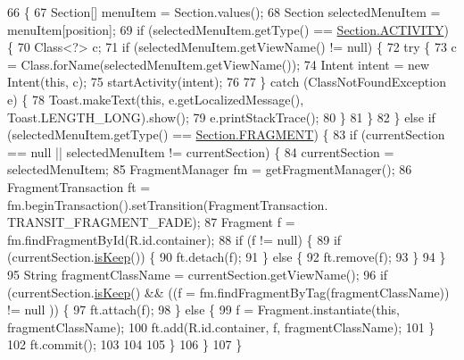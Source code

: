 \begin{DoxyCode}
66                                                              \{
67         Section[] menuItem = Section.values();
68         Section selectedMenuItem = menuItem[position];
69         \textcolor{keywordflow}{if} (selectedMenuItem.getType() == \hyperlink{enumorg_1_1buildmlearn_1_1toolkit_1_1model_1_1Section_a9afae152c2f7c91883417b9de909da27}{Section.ACTIVITY}) \{
70             Class<?> c;
71             \textcolor{keywordflow}{if} (selectedMenuItem.getViewName() != null) \{
72                 \textcolor{keywordflow}{try} \{
73                     c = Class.forName(selectedMenuItem.getViewName());
74                     Intent intent = \textcolor{keyword}{new} Intent(\textcolor{keyword}{this}, c);
75                     startActivity(intent);
76 
77                 \} \textcolor{keywordflow}{catch} (ClassNotFoundException e) \{
78                     Toast.makeText(\textcolor{keyword}{this}, e.getLocalizedMessage(), Toast.LENGTH\_LONG).show();
79                     e.printStackTrace();
80                 \}
81             \}
82         \} \textcolor{keywordflow}{else} \textcolor{keywordflow}{if} (selectedMenuItem.getType() == \hyperlink{enumorg_1_1buildmlearn_1_1toolkit_1_1model_1_1Section_a536f7f08eb441bb4af16270238999cc4}{Section.FRAGMENT}) \{
83             \textcolor{keywordflow}{if} (currentSection == null || selectedMenuItem != currentSection) \{
84                 currentSection = selectedMenuItem;
85                 FragmentManager fm = getFragmentManager();
86                 FragmentTransaction ft = fm.beginTransaction().setTransition(FragmentTransaction.
      TRANSIT\_FRAGMENT\_FADE);
87                 Fragment f = fm.findFragmentById(R.id.container);
88                 \textcolor{keywordflow}{if} (f != null) \{
89                     \textcolor{keywordflow}{if} (currentSection.\hyperlink{enumorg_1_1buildmlearn_1_1toolkit_1_1model_1_1Section_ae9b75c2d499a28b4aa0ee59fa73810f2}{isKeep}()) \{
90                         ft.detach(f);
91                     \} \textcolor{keywordflow}{else} \{
92                         ft.remove(f);
93                     \}
94                 \}
95                 String fragmentClassName = currentSection.getViewName();
96                 \textcolor{keywordflow}{if} (currentSection.\hyperlink{enumorg_1_1buildmlearn_1_1toolkit_1_1model_1_1Section_ae9b75c2d499a28b4aa0ee59fa73810f2}{isKeep}() && ((f = fm.findFragmentByTag(fragmentClassName)) != null
      )) \{
97                     ft.attach(f);
98                 \} \textcolor{keywordflow}{else} \{
99                     f = Fragment.instantiate(\textcolor{keyword}{this}, fragmentClassName);
100                     ft.add(R.id.container, f, fragmentClassName);
101                 \}
102                 ft.commit();
103 
104 
105             \}
106         \}
107     \}
\end{DoxyCode}
